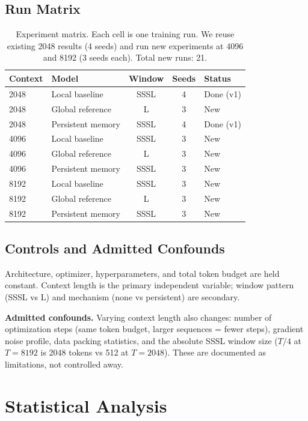 \documentclass[11pt]{article}
\begin{document}
\subsection{Run Matrix}

\begin{table}[h]
\centering
\caption{Experiment matrix. Each cell is one training run. We reuse
existing 2048 results (4 seeds) and run new experiments at 4096 and
8192 (3 seeds each). Total new runs: 21.}
\label{tab:matrix}
\begin{tabular}{llccl}
\toprule
Context & Model & Window & Seeds & Status \\
\midrule
2048 & Local baseline & SSSL & 4 & Done (v1) \\
2048 & Global reference & L & 3 & New \\
2048 & Persistent memory & SSSL & 4 & Done (v1) \\
\midrule
4096 & Local baseline & SSSL & 3 & New \\
4096 & Global reference & L & 3 & New \\
4096 & Persistent memory & SSSL & 3 & New \\
\midrule
8192 & Local baseline & SSSL & 3 & New \\
8192 & Global reference & L & 3 & New \\
8192 & Persistent memory & SSSL & 3 & New \\
\bottomrule
\end{tabular}
\end{table}

\subsection{Controls and Admitted Confounds}

Architecture, optimizer, hyperparameters, and total token budget are
held constant. Context length is the primary independent variable;
window pattern (SSSL vs L) and mechanism (none vs persistent) are
secondary.

\textbf{Admitted confounds.} Varying context length also changes:
number of optimization steps (same token budget, larger sequences =
fewer steps), gradient noise profile, data packing statistics, and
the absolute SSSL window size ($T/4$ at $T{=}8192$ is 2048 tokens
vs 512 at $T{=}2048$). These are documented as limitations, not
controlled away.


\section{Statistical Analysis}
\label{sec:statistics}
\end{document}
